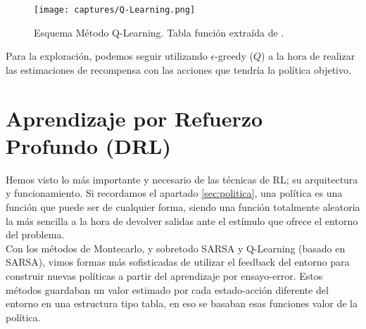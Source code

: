 \documentclass[11pt,fleqn]{book} %
\begin{document}
\begin{figure}[H]
	\centering\texttt{[image: captures/Q-Learning.png]}
	\caption{Esquema Método Q-Learning. Tabla función extraída de \cite{article:RLromero}.}
	\label{fig:qlearning} %
\end{figure}

Para la exploración, podemos seguir utilizando $\epsilon$-greedy ($Q$) a la hora de realizar las estimaciones de recompensa con las acciones que tendría la política objetivo. \\



\chapter{Aprendizaje por Refuerzo Profundo (DRL)}

Hemos visto lo más importante y necesario de las técnicas de RL; su arquitectura y funcionamiento. Si recordamos el apartado \ref{sec:politica}, una política es una función que puede ser de cualquier forma, siendo una función totalmente aleatoria la más sencilla a la hora de devolver salidas ante el estímulo que ofrece el entorno del problema. \\

Con los métodos de Montecarlo, y sobretodo SARSA y Q-Learning (basado en SARSA), vimos formas más sofisticadas de utilizar el feedback del entorno para construir nuevas políticas a partir del aprendizaje por ensayo-error. Estos métodos guardaban un valor estimado por cada estado-acción diferente del entorno en una estructura tipo tabla, en eso se basaban esas funciones valor de la política. \\
\end{document}
